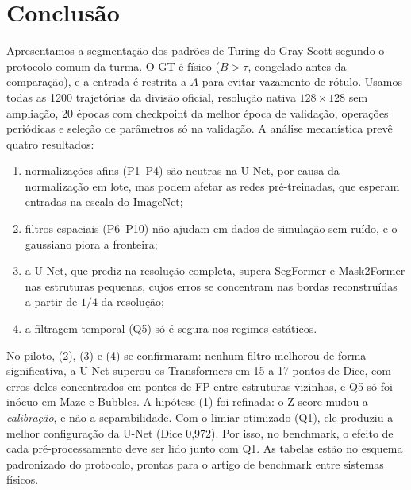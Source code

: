 \section{Conclusão}
\label{sec:conclusao}

Apresentamos a segmentação dos padrões de Turing do Gray-Scott segundo o protocolo comum da turma.
O GT é físico ($B>\tau$, congelado antes da comparação), e a entrada é restrita a $A$ para evitar
vazamento de rótulo. Usamos todas as 1200 trajetórias da divisão oficial, resolução nativa
$128\times128$ sem ampliação, 20 épocas com checkpoint da melhor época de validação, operações
periódicas e seleção de parâmetros só na validação. A análise mecanística prevê quatro resultados:
\begin{enumerate}
  \item normalizações afins (P1--P4) são neutras na U-Net, por causa da normalização em lote, mas
    podem afetar as redes pré-treinadas, que esperam entradas na escala do ImageNet;
  \item filtros espaciais (P6--P10) não ajudam em dados de simulação sem ruído, e o gaussiano piora
    a fronteira;
  \item a U-Net, que prediz na resolução completa, supera SegFormer e Mask2Former nas estruturas
    pequenas, cujos erros se concentram nas bordas reconstruídas a partir de $1/4$ da resolução;
  \item a filtragem temporal (Q5) só é segura nos regimes estáticos.
\end{enumerate}
No piloto, (2), (3) e (4) se confirmaram: nenhum filtro melhorou de forma significativa, a U-Net
superou os Transformers em 15 a 17 pontos de Dice, com erros deles concentrados em pontes de FP
entre estruturas vizinhas, e Q5 só foi inócuo em Maze e Bubbles. A hipótese (1) foi refinada: o
Z-score mudou a \emph{calibração}, e não a separabilidade. Com o limiar otimizado (Q1), ele produziu
a melhor configuração da U-Net (Dice 0,972). Por isso, no benchmark, o efeito de cada
pré-processamento deve ser lido junto com Q1.
 As tabelas estão no esquema
padronizado do protocolo, prontas para o artigo de benchmark entre sistemas físicos.
